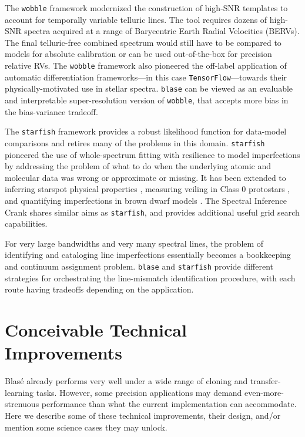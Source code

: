 \documentclass[twocolumn]{aastex631}
\begin{document}
The \texttt{wobble} framework \citep{2019AJ....158..164B} modernized the construction of high-SNR templates to account for temporally variable telluric lines. The tool requires dozens of high-SNR spectra acquired at a range of Barycentric Earth Radial Velocities (BERVs). The final telluric-free combined spectrum would still have to be compared to models for absolute calibration or can be used out-of-the-box for precision relative RVs. The \texttt{wobble} framework also pioneered the off-label application of automatic differentiation frameworks---in this case \texttt{TensorFlow}---towards their physically-motivated use in stellar spectra. \texttt{blase} can be viewed as an evaluable and interpretable super-resolution version of \texttt{wobble}, that accepts more bias in the bias-variance tradeoff.

The \texttt{starfish} framework \citep{czekala15} provides a robust likelihood function for data-model comparisons and retires many of the problems in this domain. \texttt{starfish} pioneered the use of whole-spectrum fitting with resilience to model imperfections by addressing the problem of what to do when the underlying atomic and molecular data was wrong or approximate or missing. It has been extended to inferring starspot physical properties \citep{2017ApJ...836..200G}, measuring veiling in Class 0 protostars \citep{2018ApJ...862...85G}, and quantifying imperfections in brown dwarf models \citep{2021ApJ...921...95Z}. The Spectral Inference Crank \citep[\texttt{sick},][]{2016ApJS..223....8C} shares similar aims as \texttt{starfish}, and provides additional useful grid search capabilities.

For very large bandwidths and very many spectral lines, the problem of identifying and cataloging line imperfections essentially becomes a bookkeeping and continuum assignment problem. \texttt{blase} and \texttt{starfish} provide different strategies for orchestrating the line-mismatch identification procedure, with each route having tradeoffs depending on the application.

\section{Conceivable Technical Improvements}\label{technicalInnovations}

Blas\'e already performs very well under a wide range of cloning and transfer-learning tasks. However, some precision applications may demand even-more-strenuous performance than what the current implementation can accommodate. Here we describe some of these technical improvements, their design, and/or mention some science cases they may unlock.
\end{document}
